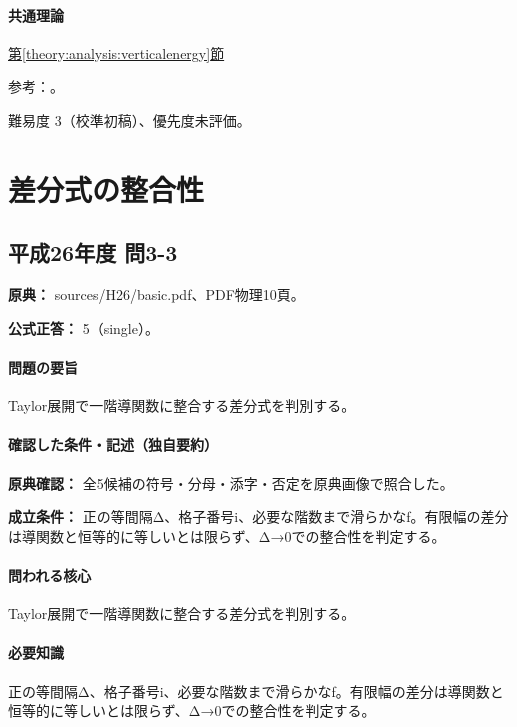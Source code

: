 \paragraph{共通理論} \hyperref[theory:analysis:verticalenergy]{第\ref*{theory:analysis:verticalenergy}節}

\par 参考：\cite{analysis57_shm}。

\par 難易度 3（校準初稿）、優先度未評価。

\section{差分式の整合性}

\subsection{平成26年度 問3-3}
\label{q:h26-reg-basic-3-3}

\noindent\textbf{原典：} sources/H26/basic.pdf、PDF物理10頁。

\textbf{公式正答：} 5（single）。

\paragraph{問題の要旨} Taylor展開で一階導関数に整合する差分式を判別する。

\paragraph{確認した条件・記述（独自要約）}\mbox{}\par

\noindent\textbf{原典確認：} 全5候補の符号・分母・添字・否定を原典画像で照合した。\par

\noindent\textbf{成立条件：} 正の等間隔Δ、格子番号i、必要な階数まで滑らかなf。有限幅の差分は導関数と恒等的に等しいとは限らず、Δ→0での整合性を判定する。\par

\paragraph{問われる核心} Taylor展開で一階導関数に整合する差分式を判別する。

\paragraph{必要知識} 正の等間隔Δ、格子番号i、必要な階数まで滑らかなf。有限幅の差分は導関数と恒等的に等しいとは限らず、Δ→0での整合性を判定する。

